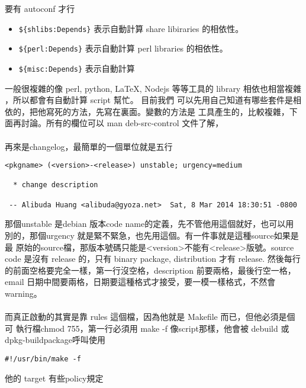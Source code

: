   要有 autoconf 才行
  \begin{itemize}
    \item \verb=${shlibs:Depends}= 表示自動計算 share libiraries 的相依性。
    \item \verb=${perl:Depends}= 表示自動計算 perl libraries 的相依性。
    \item \verb=${misc:Depends}= 表示自動計算
  \end{itemize}
  一般很複雜的像 perl, python, LaTeX, Nodejs 等等工具的 library 相依也相當複雜
  ，所以都會有自動計算 script 幫忙。
  目前我們
  可以先用自己知道有哪些套件是相依的，把他寫死的方法，先寫在裏面。變數的方法是
  工具產生的，比較複雜，下面再討論。所有的欄位可以 man deb-src-control 文件了解，
  \\\\
  再來是changelog，最簡單的一個單位就是五行
  \begin{verbatim}
<pkgname> (<version>-<release>) unstable; urgency=medium

  * change description

 -- Alibuda Huang <alibuda@gyoza.net>  Sat, 8 Mar 2014 18:30:51 -0800
  \end{verbatim}
  那個unstable 是debian 版本code name的定義，先不管他用這個就好，也可以用
  別的，那個urgency 就是緊不緊急，也先用這個。有一件事就是這種source如果是最
  原始的source檔，那版本號碼只能是<version>不能有<release>版號。source code
  是沒有 release 的，只有 binary package, distribution 才有 release. 然後每行
  的前面空格要完全一樣，第一行沒空格，description 前要兩格，最後行空一格，
  email 日期中間要兩格，日期要這種格式才接受，要一模一樣格式，不然會 warning。
  \\\\ 
  而真正啟動的其實是靠 rules 這個檔，因為他就是 Makefile 而已，但他必須是個可
  執行檔chmod 755，第一行必須用 make -f 像script那樣，他會被 debuild 或
  dpkg-buildpackage呼叫使用
  \begin{verbatim}
#!/usr/bin/make -f
  \end{verbatim}
  他的 target 有些policy規定
